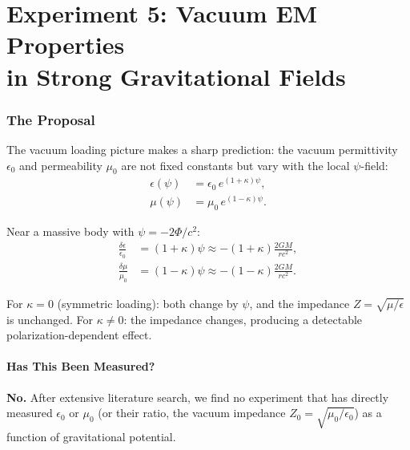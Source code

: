 \documentclass[11pt]{article}
\begin{document}
\part{Experiment 5: Vacuum EM Properties\\
in Strong Gravitational Fields}
\label{part:vacuum-em}


\section{The Proposal}
\label{sec:vacuum-em-proposal}

The vacuum loading picture makes a sharp prediction: the vacuum
permittivity $\epsilon_0$ and permeability $\mu_0$ are not fixed
constants but vary with the local $\psi$-field:
\begin{align}
\epsilon(\psi) &= \epsilon_0\, e^{(1+\kappa)\psi}, \\
\mu(\psi) &= \mu_0\, e^{(1-\kappa)\psi}.
\end{align}

Near a massive body with $\psi = -2\Phi/c^2$:
\begin{align}
\frac{\delta\epsilon}{\epsilon_0} &= (1+\kappa)\psi
\approx -(1+\kappa)\frac{2GM}{rc^2}, \\
\frac{\delta\mu}{\mu_0} &= (1-\kappa)\psi
\approx -(1-\kappa)\frac{2GM}{rc^2}.
\end{align}

For $\kappa = 0$ (symmetric loading): both change by $\psi$, and
the impedance $Z = \sqrt{\mu/\epsilon}$ is unchanged.  For
$\kappa \neq 0$: the impedance changes, producing a detectable
polarization-dependent effect.

\subsection{Has This Been Measured?}

\textbf{No.}  After extensive literature search, we find no experiment
that has directly measured $\epsilon_0$ or $\mu_0$ (or their ratio,
the vacuum impedance $Z_0 = \sqrt{\mu_0/\epsilon_0}$) as a function
of gravitational potential.
\end{document}
